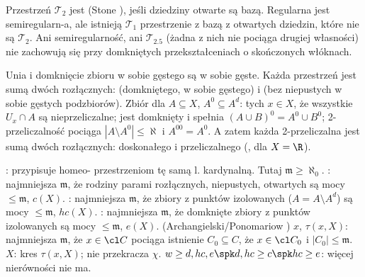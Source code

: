 Przestrzeń  $\mathcal T_2$ jest  (Stone ), jeśli dziedziny otwarte są bazą.
Regularna jest semiregularn-a, ale istnieją $\mathcal T_1$ przestrzenie z bazą z otwartych dziedzin, które nie są $\mathcal T_2$.
Ani semiregularność, ani $\mathcal T_{2.5}$ (żadna z nich nie pociąga drugiej własności) nie zachowują się przy domkniętych przekształceniach o skończonych włóknach.

Unia  i domknięcie zbioru w sobie gęstego są w sobie gęste.
Każda przestrzeń jest sumą dwóch rozłącznych:  (domkniętego, w sobie gęstego) i  (bez niepustych w sobie gęstych podzbiorów). 
Zbiór  dla $A \subseteq X$, $A^0 \subseteq A^d$: tych $x \in X$, że wszystkie $U_x \cap A$ są nieprzeliczalne; jest domknięty i spełnia $(A \cup B)^0 = A^0 \cup B^0$; 2-przeliczalność pociąga  $|A \setminus A^0| \le \aleph$ i $A^{00} = A^0$.
A zatem każda 2-przeliczalna jest sumą dwóch rozłącznych: doskonałego i przeliczalnego (,  dla $X = \R$).

:  przypisuje homeo- przestrzeniom tę samą l. kardynalną.
Tutaj $\mathfrak m \ge \aleph_0$.
: najmniejsza $\mathfrak m$, że rodziny parami rozłącznych, niepustych, otwartych są mocy $\le \mathfrak m$, $c(X)$.
: najmniejsza $\mathfrak m$, że zbiory z punktów izolowanych ($A = A \setminus A^d$) są mocy $\le \mathfrak m$, $hc(X)$.
: najmniejsza $\mathfrak m$, że domknięte zbiory z punktów izolowanych są mocy $\le \mathfrak m$, $e(X)$.
 (Archangielski/Ponomariow ) $x$, $\tau(x, X)$: najmniejsza $\mathfrak m$, że $x \in \cl C$ pociąga istnienie $C_0 \subseteq C$, że $x \in  \cl C_0$ i $|C_0| \le \mathfrak m$.
 $X$: kres $\tau(x,X)$; nie przekracza $\chi$.
$w \ge d, hc, e \spk d, hc \ge c \spk hc \ge e$: więcej nierówności nie ma.

